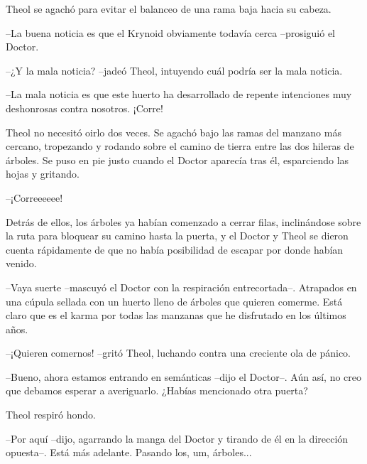 Theol se agachó para evitar el balanceo de una rama baja hacia su cabeza.



--La buena noticia es que el Krynoid obviamente todavía cerca --prosiguió el Doctor.



--¿Y la mala noticia? --jadeó Theol, intuyendo cuál podría ser la mala noticia.



--La mala noticia es que este huerto ha desarrollado de repente intenciones muy deshonrosas contra nosotros. ¡Corre!



Theol no necesitó oirlo dos veces. Se agachó bajo las ramas del manzano más cercano, tropezando y rodando sobre el camino de tierra entre las dos hileras de árboles. Se puso en pie justo cuando el Doctor aparecía tras él, esparciendo las hojas y gritando.

--¡Correeeeee!



Detrás de ellos, los árboles ya habían comenzado a cerrar filas, inclinándose sobre la ruta para bloquear su camino hasta la puerta, y el Doctor y Theol se dieron cuenta rápidamente de que no había posibilidad de escapar por donde habían venido.



--Vaya suerte --mascuyó el Doctor con la respiración entrecortada--. Atrapados en una cúpula sellada con un huerto lleno de árboles que quieren comerme. Está claro que es el karma por todas las manzanas que he disfrutado en los últimos años.



--¡Quieren comernos! --gritó Theol, luchando contra una creciente ola de pánico.



--Bueno, ahora estamos entrando en semánticas --dijo el Doctor--. Aún así, no creo que debamos esperar a averiguarlo. ¿Habías mencionado otra puerta?



Theol respiró hondo.

--Por aquí --dijo, agarrando la manga del Doctor y tirando de él en la dirección opuesta--. Está más adelante. Pasando los, um, árboles...

